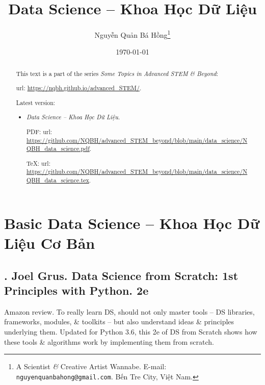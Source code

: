 \documentclass{article}
\title{Data Science -- Khoa Học Dữ Liệu}
\author{Nguyễn Quản Bá Hồng\footnote{A Scientist {\it\&} Creative Artist Wannabe. E-mail: {\tt nguyenquanbahong@gmail.com}. Bến Tre City, Việt Nam.}}
\date{\today}
\begin{document}
\maketitle
\begin{abstract}
	This text is a part of the series {\it Some Topics in Advanced STEM \& Beyond}:
	
	{\sc url}: \url{https://nqbh.github.io/advanced_STEM/}.
	
	Latest version:
	\begin{itemize}
		\item {\it Data Science -- Khoa Học Dữ Liệu}.
		
		PDF: {\sc url}: \url{https://github.com/NQBH/advanced_STEM_beyond/blob/main/data_science/NQBH_data_science.pdf}.
		
		\TeX: {\sc url}: \url{https://github.com/NQBH/advanced_STEM_beyond/blob/main/data_science/NQBH_data_science.tex}.
	\end{itemize}
\end{abstract}
\tableofcontents


\section{Basic Data Science -- Khoa Học Dữ Liệu Cơ Bản}

\subsection{\cite{Grus2019}. {\sc Joel Grus}. Data Science from Scratch: 1st Principles with Python. 2e}
{}

{\sf Amazon review.} To really learn DS, should not only master tools -- DS libraries, frameworks, modules, \& toolkits -- but also understand ideas \& principles underlying them. Updated for Python 3.6, this 2e of DS from Scratch shows how these tools \& algorithms work by implementing them from scratch.
\end{document}
